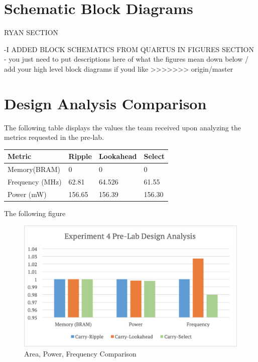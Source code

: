 \documentclass[journal, twocolumn, final,11pt,letterpaper]{IEEEtran}
\begin{document}
\section{Schematic Block Diagrams}
RYAN SECTION

-I ADDED BLOCK SCHEMATICS FROM QUARTUS IN FIGURES SECTION -  you just need to put descriptions here of what the figures mean down below / add your high level block diagrams if youd like
>>>>>>> origin/master

\section{Design Analysis Comparison}
The following table displays the values the team received upon analyzing the metrics requested in the pre-lab.
\begin{center}
	\begin{tabular}{l|lll}
		Metric & Ripple & Lookahead & Select \\ \hline
		Memory(BRAM) & 0 & 0 & 0 \\
		Frequency (MHz) & 62.81 & 64.526 & 61.55\\
		Power (mW) & 156.65 & 156.39 & 156.30\\
	\end{tabular}
\end{center}

The following figure 

\begin{figure} [H]
	\centering
	\includegraphics[scale=0.35]{pre-lab-design-analysis.png}
	\caption{Area, Power, Frequency Comparison\label{fig:pre-lab-design-analysis}}
\end{figure}


\end{document}
